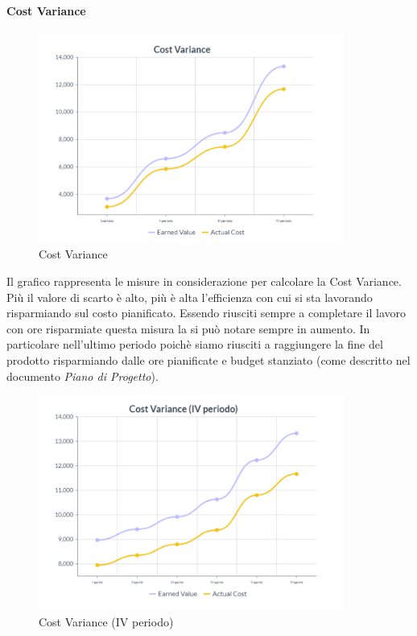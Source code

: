 \paragraph{Cost Variance}
\begin{center}
\begin{figure}[H]
  \centering
  \renewcommand{\thefigure}{7}
  \includegraphics[width=10cm]{./res/images/CVGraph.png}
  \caption{Cost Variance}
  \label{fig:Grafico Cost Variance}
\end{figure}
\end{center}
Il grafico rappresenta le misure in considerazione per calcolare la Cost Variance.\\ 
Più il valore di scarto è alto, più è alta l’efficienza con cui si sta lavorando risparmiando sul costo pianificato. Essendo riusciti sempre a completare il lavoro con ore risparmiate questa misura la si può notare sempre in aumento. In particolare nell’ultimo periodo poichè siamo riusciti a raggiungere la fine del prodotto risparmiando dalle ore pianificate e budget stanziato (come descritto nel documento \textit{Piano di Progetto}).
\begin{center}
\begin{figure}[H]
  \centering
  \renewcommand{\thefigure}{8}
  \includegraphics[width=10cm]{./res/images/CVGraphSprint.png}
  \caption{Cost Variance (IV periodo)}
  \label{fig:Grafico Cost Variance (IV periodo)}
\end{figure}
\end{center}

